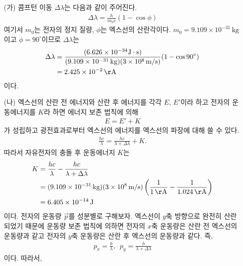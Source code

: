 \documentclass[tightenlines,floatfix,nofootinbib,superscriptaddress,fleqn]{revtex4}
\begin{document}
\begin{itemize}
  \item[(가)]
  콤프턴 이동 $\Delta\lambda$는 다음과 같이 주어진다.
  \begin{align}
    \Delta\lambda = \frac{h}{m_0c}(1-\cos\phi)
  \end{align}
  여기서 $m_0$는 전자의 정지 질량, $\phi$는 엑스선의 산란각이다.
  $m_0=9.109\times 10^{-31}\,\mathrm{kg}$이고 
  $\phi= 90^\circ$이므로 $\Delta\lambda$는
  \begin{align}
    \begin{split}
      \Delta\lambda &= \frac{(6.626\times 10^{-34}\mathrm{J\cdot s})}
      {(9.109\times 10^{-31}\,\mathrm{kg})(3\times 10^{8}\,\mathrm{m/s})}
      (1-\cos 90^\circ) \\
      &= 2.425\times 10^{-2}\,\mathrm{\AA}
    \end{split}
  \end{align}
이다.
  \item[(나)]
  엑스선의 산란 전 에너지와 산란 후 에너지를 각각 $E$, $E'$이라 하고 전자의 운동에너지를
  $K$라 하면 에너지 보존 법칙에 의해
  \begin{align}
    E = E'+K
  \end{align}
  가 성립하고 광전효과로부터 엑스선의 에너지를 엑스선의 파장에 대해 쓸 수 있다.
  \begin{align}
    \frac{hc}{\lambda} =\frac{hc}{\lambda + \Delta\lambda} + K.
  \end{align}
 따라서 자유전자의 충돌 후 운동에너지 $K$는
 \begin{align}
  \begin{split}
    K &= \frac{hc}{\lambda} - \frac{hc}{\lambda + \Delta\lambda}  \\
    &=(9.109\times 10^{-31}\,\mathrm{kg})(3\times 10^{8}\,\mathrm{m/s})
    \left(\frac{1}{1\,\mathrm{\AA}}-\frac{1}{1.024\,\mathrm{\AA}}\right) \\
    &= 6.405\times 10^{-14}\,\mathrm{J}
  \end{split}
 \end{align}
 이다. 전자의 운동량 $\vec{p}$를 성분별로 구해보자. 엑스선이 $y$축 방향으로
 완전히 산란되었기 때문에 운동량 보존 법칙에 의하면 전자의 $x$축 운동량은 
 산란 전 엑스선의 운동량과 같고 전자의 $y$축 운동량은 산란 후 엑스선의 운동량과 같다.
 즉,
 \begin{align}
  p_x = \frac{h}{\lambda},\,\,\, p_y = \frac{h}{\lambda+\Delta\lambda}
 \end{align}
 이다. 따라서,
 \begin{align}

\end{align}
\end{itemize}
\end{document}
